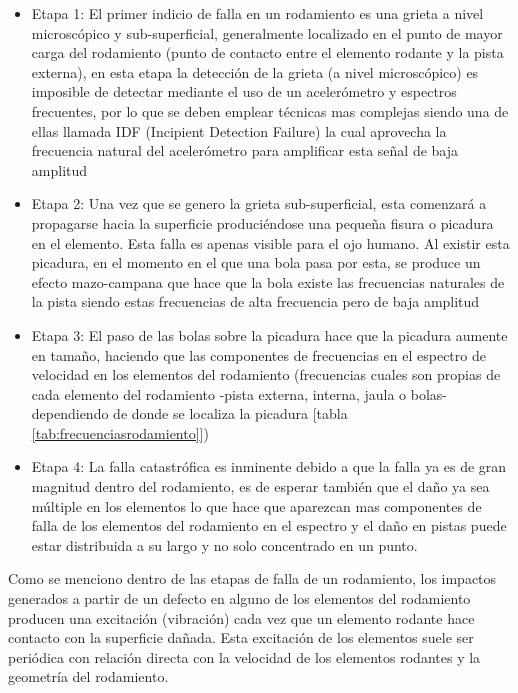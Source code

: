  				\begin{itemize}
 					\item Etapa 1: El primer indicio de falla en un rodamiento es una grieta a nivel microscópico y sub-superficial, generalmente localizado en el punto de mayor carga del rodamiento (punto de contacto entre el elemento rodante y la pista externa), en esta etapa la detección de la grieta (a nivel microscópico) es imposible de detectar mediante el uso de un acelerómetro y espectros frecuentes, por lo que se deben emplear técnicas mas complejas siendo una de ellas llamada IDF (Incipient Detection Failure) la cual aprovecha la frecuencia natural del acelerómetro para amplificar esta señal de baja amplitud 
 					\item Etapa 2: Una vez que se genero la grieta sub-superficial, esta comenzará a propagarse hacia la superficie produciéndose una pequeña fisura o picadura en el elemento. Esta falla es apenas visible para el ojo humano. Al existir esta picadura, en el momento en el que una bola pasa por esta, se produce un efecto mazo-campana que hace que la bola existe las frecuencias naturales de la pista siendo estas frecuencias de alta frecuencia pero de baja amplitud
 					\item Etapa 3: El paso de las bolas sobre la picadura hace que la picadura aumente en tamaño, haciendo que las componentes de frecuencias en el espectro de velocidad en los elementos del rodamiento (frecuencias cuales son propias de cada elemento del rodamiento -pista externa, interna, jaula o bolas- dependiendo de donde se localiza la picadura [tabla \ref{tab:frecuenciasrodamiento}]) 
 					\item Etapa 4: La falla catastrófica es inminente debido a que la falla ya es de gran magnitud dentro del rodamiento, es de esperar también que el daño ya sea múltiple en los elementos lo que hace que aparezcan mas componentes de falla de los elementos del rodamiento en el espectro y el daño en pistas puede estar distribuida a su largo y no solo concentrado en un punto.
 				\end{itemize}
 				Como se menciono dentro de las etapas de falla de un rodamiento, los impactos generados a partir de un defecto en alguno de los elementos del rodamiento producen una excitación (vibración) cada vez que un elemento rodante hace contacto con la superficie dañada. Esta excitación de los elementos suele ser periódica con relación directa con la velocidad de los elementos rodantes y la geometría del rodamiento.
 				
